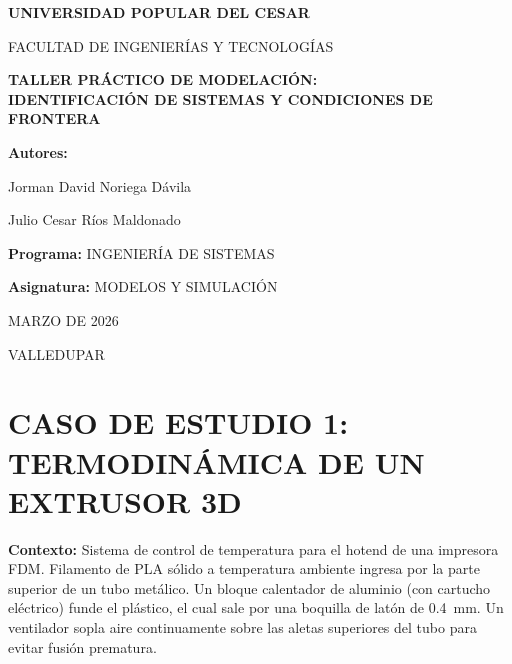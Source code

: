 \documentclass[12pt,a4paper]{article}
\begin{document}
\begin{titlepage}
    \centering
    \vspace*{1cm}
    {\large \textbf{UNIVERSIDAD POPULAR DEL CESAR}}\par
    \vspace{0.3cm}
    {\large FACULTAD DE INGENIERÍA{}S Y TECNOLOGÍAS}\par
    \vspace{3cm}
    {\LARGE \textbf{TALLER PRÁCTICO DE MODELACIÓN:\\[0.4em]
    IDENTIFICACIÓN DE SISTEMAS Y CONDICIONES DE FRONTERA}}\par
    \vspace{3cm}
    {\large \textbf{Autores:}}\par
    \vspace{0.3cm}
    {\large Jorman David Noriega Dávila}\par
    {\large Julio Cesar Ríos Maldonado}\par
    \vspace{3cm}
    {\large \textbf{Programa:} INGENIERÍA DE SISTEMAS}\par
    \vspace{0.3cm}
    {\large \textbf{Asignatura:} MODELOS Y SIMULACIÓN}\par
    \vspace{3cm}
    {\large MARZO DE 2026}\par
    \vspace{0.3cm}
    {\large VALLEDUPAR}\par
\end{titlepage}

\tableofcontents
\newpage

\section*{CASO DE ESTUDIO 1: TERMODINÁMICA DE UN EXTRUSOR 3D}

\noindent\textbf{Contexto:} Sistema de control de temperatura para el hotend de una impresora FDM.
Filamento de PLA sólido a temperatura ambiente ingresa por la parte superior de un tubo metálico.
Un bloque calentador de aluminio (con cartucho eléctrico) funde el plástico, el cual sale por una
boquilla de latón de 0.4~mm. Un ventilador sopla aire continuamente sobre las aletas superiores
del tubo para evitar fusión prematura.
\end{document}
